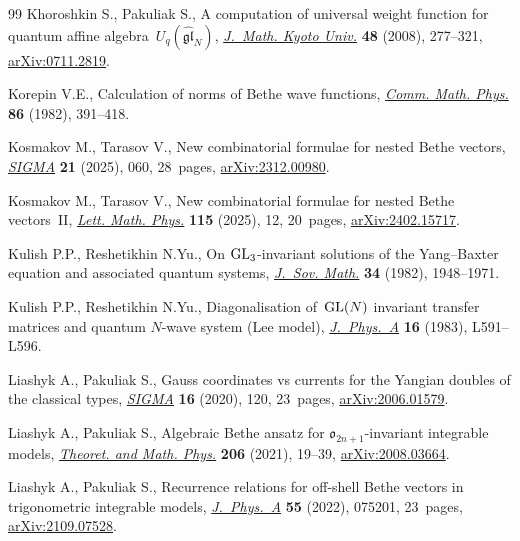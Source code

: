 \begin{thebibliography}{99}
Khoroshkin S., Pakuliak S., A computation of universal weight function for
 quantum affine algebra~{$U_q(\widehat{\mathfrak {gl}}_N)$},
 \href{https://doi.org/10.1215/kjm/1250271413}{\textit{J.~Math. Kyoto Univ.}}
 \textbf{48} (2008), 277--321,
 \href{http://arxiv.org/abs/0711.2819}{arXiv:0711.2819}.

Korepin V.E., Calculation of norms of {B}ethe wave functions,
 \href{https://doi.org/10.1007/BF01212176}{\textit{Comm. Math. Phys.}}
 \textbf{86} (1982), 391--418.

Kosmakov M., Tarasov V., New combinatorial formulae for nested {B}ethe vectors,
 \href{https://doi.org/10.3842/SIGMA.2025.060}{\textit{SIGMA}} \textbf{21}
 (2025), 060, 28~pages,
 \href{http://arxiv.org/abs/2312.00980}{arXiv:2312.00980}.

Kosmakov M., Tarasov V., New combinatorial formulae for nested {B}ethe
 vectors~{II}, \href{https://doi.org/10.1007/s11005-025-01896-2}{\textit{Lett.
 Math. Phys.}} \textbf{115} (2025), 12, 20~pages,
 \href{http://arxiv.org/abs/2402.15717}{arXiv:2402.15717}.

Kulish P.P., Reshetikhin N.Yu., On {${\rm GL}\sb{3}$}-invariant solutions of the
 {Y}ang--{B}axter equation and associated quantum systems,
 \href{https://doi.org/10.1007/BF01095104}{\textit{J.~Sov. Math.}} \textbf{34}
 (1982), 1948--1971.

Kulish P.P., Reshetikhin N.Yu., Diagonalisation of~{${\rm GL}(N)$} invariant
 transfer matrices and quantum {$N$}-wave system ({L}ee model),
 \href{https://doi.org/10.1088/0305-4470/16/16/001}{\textit{J.~Phys.~A}}
 \textbf{16} (1983), L591--L596.

Liashyk A., Pakuliak S., Gauss coordinates vs currents for the {Y}angian
 doubles of the classical types,
 \href{https://doi.org/10.3842/SIGMA.2020.120}{\textit{SIGMA}} \textbf{16}
 (2020), 120, 23~pages,
 \href{http://arxiv.org/abs/2006.01579}{arXiv:2006.01579}.

Liashyk A., Pakuliak S., Algebraic {B}ethe ansatz for {$\mathfrak
 o_{2n+1}$}-invariant integrable models,
 \href{https://doi.org/10.1134/S0040577921010025}{\textit{Theoret. and Math.
 Phys.}} \textbf{206} (2021), 19--39,
 \href{http://arxiv.org/abs/2008.03664}{arXiv:2008.03664}.

Liashyk A., Pakuliak S., Recurrence relations for off-shell {B}ethe vectors in
 trigonometric integrable models,
 \href{https://doi.org/10.1088/1751-8121/ac491b}{\textit{J.~Phys.~A}}
 \textbf{55} (2022), 075201, 23~pages,
 \href{http://arxiv.org/abs/2109.07528}{arXiv:2109.07528}.


\end{thebibliography}

